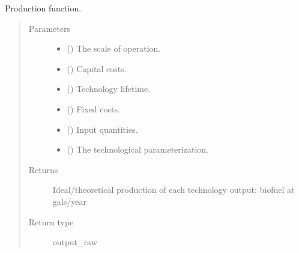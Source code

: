\documentclass[letterpaper,10pt,english]{sphinxmanual}
\begin{document}
\begin{fulllineitems}
\label{\detokenize{doc-src/technology:technology.biorefinery_v1.production}}
Production function.
\begin{quote}\begin{description}
\item[{Parameters}] \leavevmode\begin{itemize}
\item {} 
 () \textendash{} The scale of operation.

\item {} 
 () \textendash{} Capital costs.

\item {} 
 () \textendash{} Technology lifetime.

\item {} 
 () \textendash{} Fixed costs.

\item {} 
 () \textendash{} Input quantities.

\item {} 
 () \textendash{} The technological parameterization.

\end{itemize}

\item[{Returns}] \leavevmode
Ideal/theoretical production of each technology output: biofuel at
gals/year

\item[{Return type}] \leavevmode
output\_raw

\end{description}\end{quote}

\end{fulllineitems}
\end{document}
